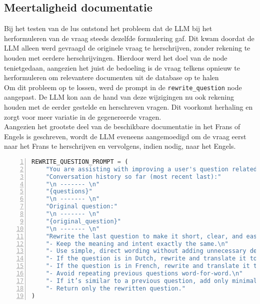 \subsection{Meertaligheid documentatie}
Bij het testen van de lus ontstond het probleem dat de LLM bij het herformuleren van de vraag steeds dezelfde formulering gaf. Dit kwam doordat de LLM alleen werd gevraagd de originele vraag te herschrijven, zonder rekening te houden met eerdere herschrijvingen. Hierdoor werd het doel van de node tenietgedaan, aangezien het juist de bedoeling is de vraag telkens opnieuw te herformuleren om relevantere documenten uit de database op te halen 
\\[1em]
Om dit probleem op te lossen, werd de prompt in de \verb|rewrite_question| node aangepast. De LLM kon aan de hand van deze wijzigingen nu ook rekening houden met de eerder gestelde en herschreven vragen. Dit voorkomt herhaling en zorgt voor meer variatie in de gegenereerde vragen.
\\[1em]
Aangezien het grootste deel van de beschikbare documentatie in het Frans of Engels is geschreven, wordt de LLM eveneens aangemoedigd om de vraag eerst naar het Frans te herschrijven en vervolgens, indien nodig, naar het Engels.

\begin{lstlisting}[basicstyle=\small, frame=single, breaklines=true, postbreak=\mbox{\textcolor{red}{$\hookrightarrow$}\space}, escapeinside ={\%,}, escapechar={!}, numbers=left, language=Python, caption=Prompt om vraag te herschrijven]
REWRITE_QUESTION_PROMPT = (
    "You are assisting with improving a user's question related to Myminfin IT support.\n"
    "Conversation history so far (most recent last):"
    "\n ------- \n"
    "{questions}"
    "\n ------- \n"
    "Original question:"
    "\n ------- \n"
    "{original_question}"
    "\n ------- \n"
    "Rewrite the last question to make it short, clear, and easy to match with relevant documents in a vector database.\n"
    "- Keep the meaning and intent exactly the same.\n"
    "- Use simple, direct wording without adding unnecessary details.\n"
    "- If the question is in Dutch, rewrite and translate it to French.\n"
    "- If the question is in French, rewrite and translate it to English.\n"
    "- Avoid repeating previous questions word-for-word.\n"
    "- If it’s similar to a previous question, add only minimal context needed for distinction.\n"
    "- Return only the rewritten question."
)
\end{lstlisting}
